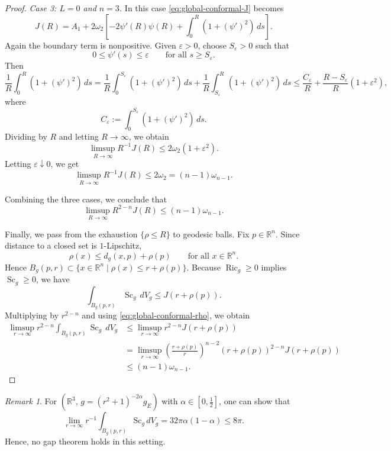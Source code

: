 \documentclass[12pt,oneside,a4paper]{article}
\theoremstyle{mytheorem}
\theoremstyle{remark}
\newtheorem{remark}[definition]{Remark}
\begin{document}
\begin{proof}
\noindent\emph{Case 3: $L=0$ and $n=3$.}
In this case \eqref{eq:global-conformal-J} becomes
\[
J(R)
=
A_1
+
2\omega_2\left[
-2\psi'(R)\psi(R)+\int_0^R (1+(\psi')^2)\,ds
\right].
\]
Again the boundary term is nonpositive. Given \(\varepsilon>0\), choose
\(S_\varepsilon>0\) such that
\[
0\le \psi'(s)\le \varepsilon
\qquad\text{for all }s\ge S_\varepsilon.
\]
Then
\[
\frac1R\int_0^R (1+(\psi')^2)\,ds
=
\frac1R\int_0^{S_\varepsilon}(1+(\psi')^2)\,ds
+
\frac1R\int_{S_\varepsilon}^R(1+(\psi')^2)\,ds
\le
\frac{C_\varepsilon}{R}+\frac{R-S_\varepsilon}{R}(1+\varepsilon^2),
\]
where
\[
C_\varepsilon:=\int_0^{S_\varepsilon}(1+(\psi')^2)\,ds.
\]
Dividing by \(R\) and letting \(R\to\infty\), we obtain
\[
\limsup_{R\to\infty}R^{-1}J(R)\le 2\omega_2(1+\varepsilon^2).
\]
Letting \(\varepsilon\downarrow0\), we get
\[
\limsup_{R\to\infty}R^{-1}J(R)\le 2\omega_2=(n-1)\omega_{n-1}.
\]

Combining the three cases, we conclude that
\begin{equation}\label{eq:global-conformal-rho}
\limsup_{R\to\infty}R^{2-n}J(R)\le (n-1)\omega_{n-1}.
\end{equation}


Finally, we pass from the exhaustion $\{\rho \le R\}$ to geodesic balls.
Fix $p\in\mathbb R^n$. Since distance to a closed set is $1$-Lipschitz,
\[
\rho(x)\le d_g(x,p)+\rho(p)
\qquad\text{for all }x\in\mathbb R^n.
\]
Hence $B_g(p,r)\subset \{ x \in \mathbb{R}^n \mid \rho(x) \le r + \rho(p) \}.$ Because $\operatorname{Ric}_g\ge 0$ implies $\operatorname{Sc}_g\ge 0$, we have
\[
\int_{B_g(p,r)} \operatorname{Sc}_g\,dV_g
\le J(r+\rho(p)).
\]
Multiplying by $r^{2-n}$ and using \eqref{eq:global-conformal-rho}, we obtain
\[
\begin{aligned}
\limsup_{r\to\infty}
r^{2-n}\int_{B_g(p,r)} \operatorname{Sc}_g\,dV_g
&\le
\limsup_{r\to\infty} r^{2-n}J(r+\rho(p)) \\
&=
\limsup_{r\to\infty}
\left(\frac{r+\rho(p)}{r}\right)^{n-2}
(r+\rho(p))^{2-n}J(r+\rho(p)) \\
&\le (n-1)\omega_{n-1}.
\end{aligned}
\]
\end{proof}


\begin{remark}
For $(\mathbb{R}^{3},\, g = (r^{2}+1)^{-2\alpha} g_{E})$ with $\alpha \in [0, \tfrac{1}{2}]$, one can show that
\[
\lim_{r \to \infty} r^{-1} \int_{B_g(p,r)} \mathrm{Sc}_g \, dV_g
= 32\pi \alpha(1-\alpha) \le 8\pi.
\]
Hence, no gap theorem holds in this setting.
\end{remark}
\end{document}
